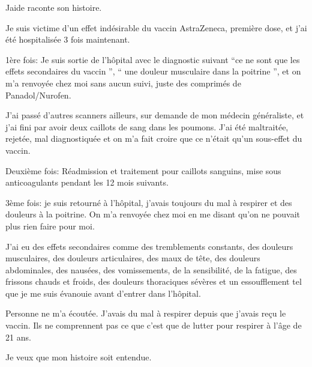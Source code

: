 Jaide raconte son histoire.

Je suis victime d'un effet indésirable du vaccin AstraZeneca, première dose, et
j'ai été hospitalisée 3 fois maintenant.

1ère fois: Je suis sortie de l'hôpital avec le diagnostic suivant “ce ne sont
que les effets secondaires du vaccin ”, “ une douleur musculaire dans la
poitrine ”, et on m'a renvoyée chez moi sans aucun suivi, juste des comprimés de
Panadol/Nurofen.

J'ai passé d'autres scanners ailleurs, sur demande de mon médecin généraliste,
et j'ai fini par avoir deux caillots de sang dans les poumons. J'ai été
maltraitée, rejetée, mal diagnostiquée et on m'a fait croire que ce n'était
qu'un sous-effet du vaccin.

Deuxième fois: Réadmission et traitement pour caillots sanguins, mise sous
anticoagulants pendant les 12 mois suivants.

3ème fois: je suis retourné à l'hôpital, j'avais toujours du mal à respirer et
des douleurs à la poitrine. On m'a renvoyée chez moi en me disant qu'on ne
pouvait plus rien faire pour moi.

J'ai eu des effets secondaires comme des tremblements constants, des douleurs
musculaires, des douleurs articulaires, des maux de tête, des douleurs
abdominales, des nausées, des vomissements, de la sensibilité, de la fatigue,
des frissons chauds et froids, des douleurs thoraciques sévères et un
essoufflement tel que je me suis évanouie avant d'entrer dans l'hôpital.

Personne ne m'a écoutée. J'avais du mal à respirer depuis que j'avais reçu le
vaccin. Ils ne comprennent pas ce que c'est que de lutter pour respirer à l'âge
de 21 ans.

Je veux que mon histoire soit entendue.

